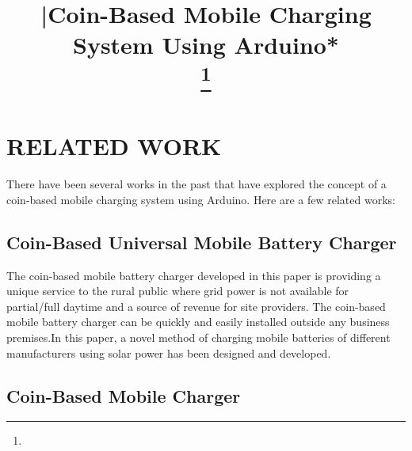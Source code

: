 \documentclass[conference]{IEEEtran}
\begin{document}
\title{|Coin-Based Mobile Charging System Using Arduino*\\
{\footnotesize \textsuperscript{}}
\thanks{}
}

\author{ 
\and
{}
}

\maketitle

\section{RELATED WORK}
There have been several works in the past that have explored the concept of a coin-based mobile charging system using Arduino. Here are a few related works:

\subsection{Coin-Based Universal Mobile Battery Charger}\label{AA11}
The coin-based mobile battery charger developed in this paper is providing a unique service to the rural public where grid power is not available for partial/full daytime and a source of revenue for site providers. The coin-based mobile battery charger can be quickly and easily installed outside any business
premises.In this paper, a novel method of charging mobile batteries of different manufacturers using solar power has been designed and developed.

\subsection{Coin-Based Mobile Charger}\label{AA}
\end{document}
